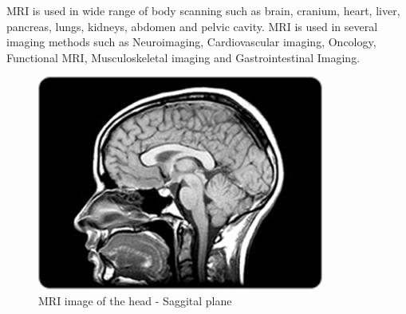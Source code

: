 \documentclass[12pt]{article}
\begin{document}
MRI is used in wide range of body scanning such as brain, cranium, heart, liver, pancreas, lungs, kidneys, abdomen and pelvic cavity. MRI is used in several imaging methods such as Neuroimaging, Cardiovascular imaging, Oncology, Functional MRI, Musculoskeletal imaging and Gastrointestinal Imaging. 


\begin{figure}[h!]
  \centering
  \includegraphics[width=0.45\linewidth]{MRI1.jpg}
  \caption{\small{MRI image of the head - Saggital plane}}
  \label{fig:MRI image of the head}
\end{figure}
\end{document}
